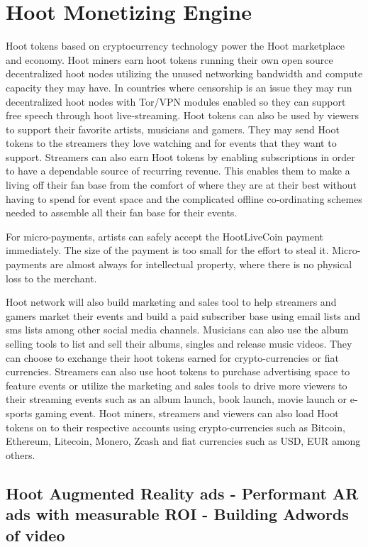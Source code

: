 \documentclass{article}
\begin{document}
\section{Hoot Monetizing Engine}
Hoot tokens based on cryptocurrency technology power the Hoot marketplace and economy. Hoot miners earn hoot tokens running their own open source decentralized hoot nodes utilizing the unused networking bandwidth and compute capacity they may have. In countries where censorship is an issue they may run decentralized hoot nodes with Tor/VPN modules enabled so they can support free speech through hoot live-streaming. Hoot tokens can also be used by viewers to support their favorite artists, musicians and gamers. They may send Hoot tokens to the streamers they love watching and for events that they want to support. Streamers can also earn Hoot tokens by enabling subscriptions in order to have a dependable source of recurring revenue. This enables them to make a living off their fan base from the comfort of where they are at their best without having to spend for event space and the complicated offline co-ordinating schemes needed to assemble all their fan base for their events.

For micro-payments, artists can safely accept the HootLiveCoin payment immediately. The size of the payment is too small for the effort to steal it. Micro-payments are almost always for intellectual property, where there is no physical loss to the merchant.

 Hoot network will also build marketing and sales tool to help streamers and gamers market their events and build a paid subscriber base using email lists and sms lists among other social media channels. 
Musicians can also use the album selling tools to list and sell their albums, singles and release music videos. They can choose to exchange their hoot tokens earned for crypto-currencies or fiat currencies.
 Streamers can also use hoot tokens to purchase advertising space to feature events or utilize the marketing and sales tools to drive more viewers to their streaming events such as an album launch, book launch, movie launch or e-sports gaming event. Hoot miners, streamers and viewers can also load Hoot tokens on to their respective accounts using crypto-currencies such as Bitcoin, Ethereum, Litecoin, Monero, Zcash and fiat currencies such as USD, EUR among others.

\subsection{Hoot Augmented Reality ads - Performant AR ads with
 measurable ROI - Building Adwords of video }
\end{document}
